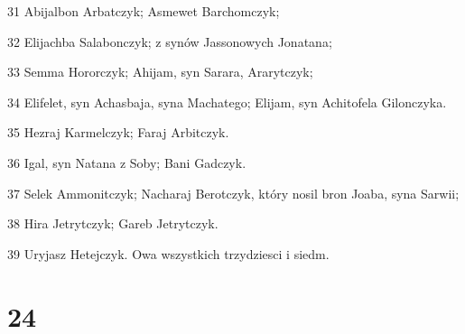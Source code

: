 \par 31 Abijalbon Arbatczyk; Asmewet Barchomczyk;
\par 32 Elijachba Salabonczyk; z synów Jassonowych Jonatana;
\par 33 Semma Hororczyk; Ahijam, syn Sarara, Ararytczyk;
\par 34 Elifelet, syn Achasbaja, syna Machatego; Elijam, syn Achitofela Gilonczyka.
\par 35 Hezraj Karmelczyk; Faraj Arbitczyk.
\par 36 Igal, syn Natana z Soby; Bani Gadczyk.
\par 37 Selek Ammonitczyk; Nacharaj Berotczyk, który nosil bron Joaba, syna Sarwii;
\par 38 Hira Jetrytczyk; Gareb Jetrytczyk.
\par 39 Uryjasz Hetejczyk. Owa wszystkich trzydziesci i siedm.

\chapter{24}

